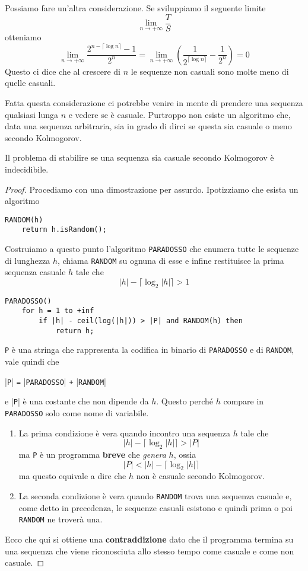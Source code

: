 Possiamo fare un'altra considerazione. Se sviluppiamo il seguente limite
\[ \lim_{n \rightarrow +\infty} \frac{T}{S} \]
otteniamo
\[
	\lim_{n \rightarrow +\infty} \frac{2^{n - \lceil \log n \rceil} - 1}{2^n} =
	\lim_{n \rightarrow +\infty} \left( \frac{1}{2^{\lceil \log n \rceil}} - \frac{1}{2^n}\right) = 0
\]
Questo ci dice che al crescere di $n$ le sequenze non casuali sono molte meno di quelle casuali.

Fatta questa considerazione ci potrebbe venire in mente di prendere una sequenza qualsiasi lunga $n$ e vedere se \`e
casuale. Purtroppo non esiste un algoritmo che, data una sequenza arbitraria, sia in grado di dirci se questa sia
casuale o meno secondo Kolmogorov.

\begin{theorem}
	Il problema di stabilire se una sequenza sia casuale secondo Kolmogorov \`e indecidibile.
	\begin{proof}
		Procediamo con una dimostrazione per assurdo. Ipotizziamo che esista un algoritmo
		\begin{lstlisting}[style=pseudo-style]
RANDOM(h)
	return h.isRandom();
		\end{lstlisting}
		Costruiamo a questo punto l'algoritmo \verb|PARADOSSO| che enumera tutte le sequenze di lunghezza $h$, chiama
		\verb|RANDOM| su ognuna di esse	e infine restituisce la prima sequenza casuale $h$ tale che
		\[ |h| - \lceil \log_2 |h| \rceil > 1 \]
		\begin{lstlisting}[style=pseudo-style]
PARADOSSO()
	for h = 1 to +inf
		if |h| - ceil(log(|h|)) > |P| and RANDOM(h) then
			return h;
		\end{lstlisting}
		\verb|P| \`e una stringa che rappresenta la codifica in binario di \verb|PARADOSSO| e di \verb|RANDOM|, vale
		quindi che
		\begin{center}
			|\verb|P|| \verb|=| |\verb|PARADOSSO|| \verb|+| |\verb|RANDOM||
		\end{center}
		e |\verb|P|| \`e una costante che non dipende da $h$. Questo perch\'e $h$ compare in \verb|PARADOSSO| solo come
		nome di variabile.

		\begin{enumerate}
			\item La prima condizione \`e vera quando incontro una sequenza $h$ tale che
			      \[ |h| - \lceil \log_2 |h| \rceil > |P| \]
			      ma \verb|P| \`e un programma \textbf{breve} che \emph{genera} $h$, ossia
			      \[ |P| < |h| - \lceil \log_2 |h| \rceil \]
			      ma questo equivale a dire che $h$ non \`e casuale secondo Kolmogorov.
			\item La seconda condizione \`e vera quando \verb|RANDOM| trova una sequenza casuale e, come detto in
			      precedenza, le sequenze casuali esistono e quindi prima o poi \verb|RANDOM| ne trover\`a una.
		\end{enumerate}
		Ecco che qui si ottiene una \textbf{contraddizione} dato che il programma termina su una sequenza che viene
		riconosciuta allo stesso tempo come casuale e come non casuale.
	\end{proof}
\end{theorem}

